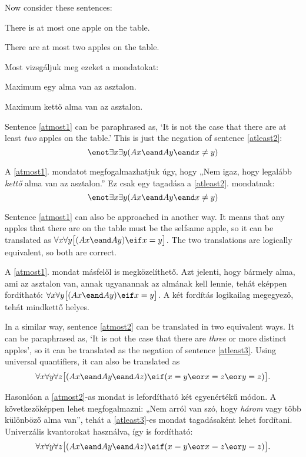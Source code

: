Now consider these sentences:
\begin{earg}
\item[\ex{atmost1}] There is at most one apple on the table.
\item[\ex{atmost2}] There are at most two apples on the table.
\end{earg}


Most vizsgáljuk meg ezeket a mondatokat:
\begin{earg}
\item[\ex{atmost1}] Maximum egy alma van az asztalon.
\item[\ex{atmost2}] Maximum kettő alma van az asztalon.
\end{earg}

Sentence \ref{atmost1} can be paraphrased as, `It is not the case that there are at least \emph{two} apples on the table.' This is just the negation of sentence \ref{atleast2}: $$\enot \exists x \exists y(Ax \eand Ay \eand x\neq y)$$

A \ref{atmost1}. mondatot megfogalmazhatjuk úgy, hogy „Nem igaz, hogy legalább \emph{kettő} alma van az asztalon.” Ez csak egy tagadása a \ref{atleast2}. mondatnak: $$\enot \exists x \exists y(Ax \eand Ay \eand x\neq y)$$



Sentence \ref{atmost1} can also be approached in another way. It means that any apples that there are on the table must be the selfsame apple, so it can be translated as $\forall x\forall y\bigl[(Ax \eand Ay) \eif x=y\bigr]$. The two translations are logically equivalent, so both are correct.

A \ref{atmost1}. mondat másfelől is megközelíthető. Azt jelenti, hogy bármely alma, ami az asztalon van, annak ugyanannak az almának kell lennie, tehát eképpen fordítható: $\forall x\forall y\bigl[(Ax \eand Ay) \eif x=y\bigr]$. A két fordítás logikailag megegyező, tehát mindkettő helyes.

In a similar way, sentence \ref{atmost2} can be translated in two equivalent ways. It can be paraphrased as, `It is not the case that there are \emph{three} or more distinct apples', so it can be translated as the negation of sentence \ref{atleast3}. Using universal quantifiers, it can also be translated as
$$\forall x\forall y\forall z\bigl[(Ax \eand Ay \eand Az) \eif (x=y \eor x=z \eor y=z)\bigr].$$

Hasonlóan a \ref{atmost2}-as mondat is lefordítható két egyenértékű módon. A következőképpen lehet megfogalmazni: „Nem arról van szó, hogy \emph{három} vagy több különböző alma van”, tehát a \ref{atleast3}-es mondat tagadásaként lehet fordítani. Univerzális kvantorokat használva, így is fordítható:
$$\forall x\forall y\forall z\bigl[(Ax \eand Ay \eand Az) \eif (x=y \eor x=z \eor y=z)\bigr].$$

